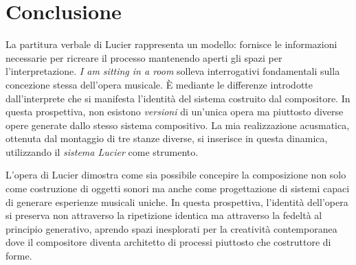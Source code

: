 
\section{Conclusione}
La partitura verbale di Lucier rappresenta un modello: fornisce le informazioni necessarie per ricreare il processo mantenendo aperti gli spazi per l'interpretazione. \textit{I am sitting in a room} solleva interrogativi fondamentali sulla concezione stessa dell'opera musicale. È mediante le differenze introdotte dall'interprete che si manifesta l'identità del sistema costruito dal compositore. In questa prospettiva, non esistono \textit{versioni} di un'unica opera ma piuttosto diverse opere generate dallo stesso sistema compositivo. La mia realizzazione acusmatica, ottenuta dal montaggio di tre stanze diverse, si inserisce in questa dinamica, utilizzando il \textit{sistema Lucier} come strumento.

L'opera di Lucier dimostra come sia possibile concepire la composizione non solo come costruzione di oggetti sonori ma anche come progettazione di sistemi capaci di generare esperienze musicali uniche. In questa prospettiva, l'identità dell'opera si preserva non attraverso la ripetizione identica ma attraverso la fedeltà al principio generativo, aprendo spazi inesplorati per la creatività contemporanea dove il compositore diventa architetto di processi piuttosto che costruttore di forme.